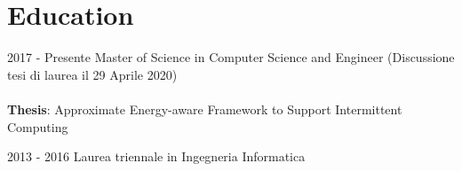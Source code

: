 \documentclass[letterpaper]{twentysecondcvit} %
\begin{document}
\makeprofile %

\section{Education}
\begin{twenty}
	\twentyitem
	{2017 -}
	{Presente}
	{Master of Science in Computer Science and Engineer}
	{}
	{
	(Discussione tesi di laurea il 29 Aprile 2020)\\ \\
	{
	\textbf{Thesis}: Approximate Energy-aware Framework to Support Intermittent Computing
	}
	}
	{\footnotesize{}}

	\twentyitem
	{2013 - 2016}
	{}
	{Laurea triennale in Ingegneria Informatica}
	{}
	{}
	{\footnotesize{}}
\end{twenty}


\end{document}
